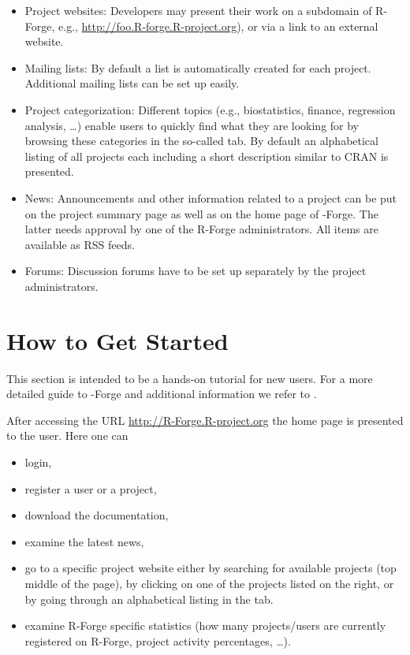 \begin{itemize}
\item Project websites: Developers may present their work
  on a subdomain of R-Forge, e.g.,
  \url{http://foo.R-forge.R-project.org}), or via a link to an
  external website.
\item Mailing lists: By default a list
   is automatically
  created for each project. Additional mailing lists can be
  set up easily.
\item Project categorization: Different
  topics (e.g., biostatistics, finance, regression analysis,
  \ldots) enable users to quickly find what they are
  looking for by browsing these categories in the so-called
   tab. By default an alphabetical listing of all
  projects each including a short description similar to CRAN is
  presented.
\item News: Announcements and other information related to a project
  can be put on the project summary page as well as on the 
  home page of \R{}-Forge. The latter needs approval by one of the R-Forge
  administrators. All items are available as RSS feeds.
\item Forums: Discussion forums have to be set up separately by the
  project administrators.%
\end{itemize}

\section{How to Get Started}
This section is intended to be a hands-on tutorial for new users. For
a more detailed guide to \R{}-Forge and additional 
information we refer to \citep[][subsequently
referred to as user's manual]{forge:usermanual:2008}.

After accessing the URL \url{http://R-Forge.R-project.org} the home
page is presented to the user. Here one can
\begin{itemize}
\item login,
\item register a user or a project,
\item download the documentation,
\item examine the latest news,
\item go to a specific project website either by searching for available
  projects (top middle of the page), by clicking on one of the projects
  listed on the right, or by going through an alphabetical listing in
  the  tab. 
\item examine R-Forge specific statistics (how many projects/users
  are currently registered on R-Forge, project activity percentages,
  \ldots{}).
\end{itemize}

